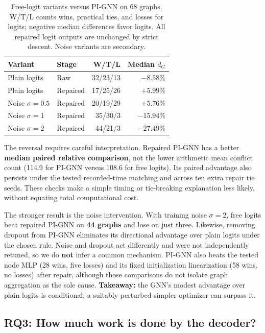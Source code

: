 \documentclass[11pt,letterpaper,twocolumn]{article}
\begin{document}
\begin{table}[H]
\centering
\small
\setlength{\tabcolsep}{3.5pt}
\begin{tabular}{@{}llrr@{}}
\toprule
Variant & Stage & W/T/L & Median $d_G$ \\
\midrule
Plain logits & Raw & 32/23/13 & $-8.58\%$ \\
Plain logits & Repaired & 17/25/26 & $+5.99\%$ \\
Noise $\sigma=0.5$ & Repaired & 20/19/29 & $+5.76\%$ \\
Noise $\sigma=1$ & Repaired & 35/30/3 & $-15.94\%$ \\
Noise $\sigma=2$ & Repaired & 44/21/3 & $-27.49\%$ \\
\bottomrule
\end{tabular}
\caption{Free-logit variants versus PI-GNN on 68 graphs. W/T/L counts wins, practical ties, and losses for logits; negative median differences favor logits. All repaired logit outputs are unchanged by strict descent. Noise variants are secondary.}
\label{tab:optimizers}
\end{table}
The reversal requires careful interpretation. Repaired PI-GNN has a better \textbf{median paired relative comparison}, not the lower arithmetic mean conflict count (114.9 for PI-GNN versus 108.6 for free logits). Its paired advantage also persists under the tested recorded-time matching and across ten extra repair tie seeds. These checks make a simple timing or tie-breaking explanation less likely, without equating total computational cost.

The stronger result is the noise intervention. With training noise \(\sigma=2\), free logits beat repaired PI-GNN on \textbf{44 graphs} and lose on just three. Likewise, removing dropout from PI-GNN eliminates its directional advantage over plain logits under the chosen rule. Noise and dropout act differently and were not independently retuned, so we do \textbf{not} infer a common mechanism. PI-GNN also beats the tested node MLP (28 wins, five losses) and its fixed initialization linearization (58 wins, no losses) after repair, although those comparisons do not isolate graph aggregation as the sole cause. \textbf{Takeaway:} the GNN's modest advantage over plain logits is conditional; a suitably perturbed simpler optimizer can surpass it.

\subsection{RQ3: How much work is done by the decoder?}\label{rq3-how-much-work-is-done-by-the-decoder}
\end{document}
